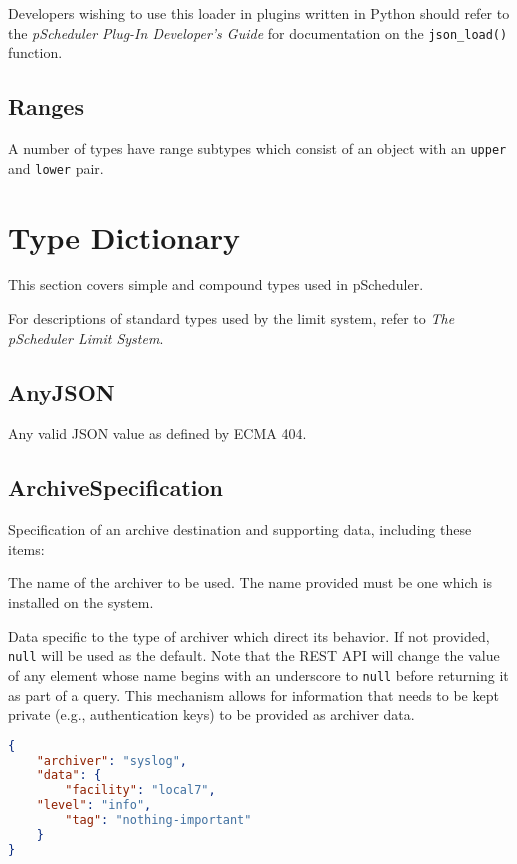 \documentclass[10pt]{article}
\begin{document}
Developers wishing to use this loader in plugins written in Python
should refer to the {\it pScheduler Plug-In Developer's Guide} for
documentation on the {\tt json_load()} function.  



\subsection{Ranges}\label{ranges}
A number of types have range subtypes which consist of an object with
an {\tt upper} and {\tt lower} pair.







%
%

\section{Type Dictionary}

This section covers simple and compound types used in pScheduler.

For descriptions of standard types used by the limit system, refer to
{\it The pScheduler Limit System}.


\subsection{AnyJSON}
Any valid JSON value as defined by ECMA 404.



\subsection{ArchiveSpecification}
Specification of an archive destination and supporting data, including these items:

 The name of the archiver to be used.  The
name provided must be one which is installed on the system.

 Data specific to the type of archiver which
direct its behavior.  If not provided, {\tt null} will be used as the
default.  Note that the REST API will change the value of any element
whose name begins with an underscore to {\tt null} before returning it
as part of a query.  This mechanism allows for information that needs
to be kept private (e.g., authentication keys) to be provided as
archiver data.

\example
\begin{lstlisting}[language=json]
{
    "archiver": "syslog",
    "data": {
        "facility": "local7",
	"level": "info",
        "tag": "nothing-important"
    }
}
\end{lstlisting}
\end{document}
